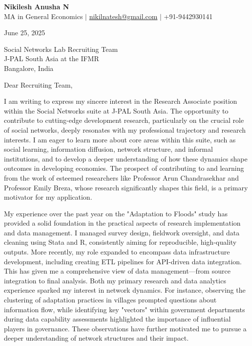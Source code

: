 \documentclass[a4paper]{scrartcl}
\begin{document}
\begin{center}
    \Large\textbf{Nikilesh Anusha N} \\
    \vspace{0.1em}
    \large{MA in General Economics $|$ \href{mailto:nikilnatesh@gmail.com}{nikilnatesh@gmail.com} $|$ +91-9442930141}
\end{center}

\vspace{1em}

June 25, 2025 \\

\vspace{1em}

Social Networks Lab Recruiting Team \\
J-PAL South Asia at the IFMR \\
Bangalore, India \\

\vspace{1em}

Dear Recruiting Team,

\vspace{0.5em}

\justifying

I am writing to express my sincere interest in the Research Associate position within the Social Networks suite at J-PAL South Asia. 
The opportunity to contribute to cutting-edge development research, particularly on the crucial role of social networks, deeply resonates with my professional trajectory and research interests. 
I am eager to learn more about core areas within this suite, such as social learning, information diffusion, network structure, and informal institutions, and to develop a deeper understanding of how these dynamics shape outcomes in developing economies. 
The prospect of contributing to and learning from the work of esteemed researchers like Professor Arun Chandrasekhar and Professor Emily Breza, whose research significantly shapes this field, is a primary motivator for my application.

My experience over the past year on the "Adaptation to Floods" study has provided a solid foundation in the practical aspects of research implementation and data management. 
I managed survey design, fieldwork oversight, and data cleaning using Stata and R, consistently aiming for reproducible, high-quality outputs. 
More recently, my role expanded to encompass data infrastructure development, including creating ETL pipelines for API-driven data integration. 
This has given me a comprehensive view of data management—from source integration to final analysis. Both my primary research and data analytics experience sparked my interest in network dynamics. 
For instance, observing the clustering of adaptation practices in villages prompted questions about information flow, while identifying key "vectors" within government departments during data capability assessments highlighted the importance of influential players in governance. 
These observations have further motivated me to pursue a deeper understanding of network structures and their impact.
\end{document}
